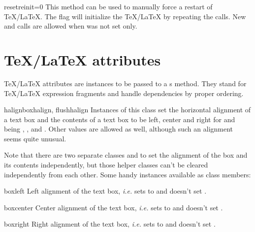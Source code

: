 \begin{methoddesc}{reset}{reinit=0}
  This method can be used to manually force a restart of
  \TeX/\LaTeX{}. The flag  will initialize the
  \TeX/\LaTeX{} by repeating the  calls. New
   and  calls are allowed when
   was not set only.
\end{methoddesc}


\section[TeX/LaTeX attributes]
{\TeX/\LaTeX{} attributes}

\TeX/\LaTeX{} attributes are instances to be passed to a
s  method. They stand for
\TeX/\LaTeX{} expression fragments and handle dependencies by proper
ordering.

\begin{classdesc}{halign}{boxhalign, flushhalign}
  Instances of this class set the horizontal alignment of a text box
  and the contents of a text box to be left, center and right for
   and  being , ,
  and . Other values are allowed as well, although such an
  alignment seems quite unusual.
\end{classdesc}

Note that there are two separate classes  and
 to set the alignment of the box and its contents
independently, but those helper classes can't be cleared independently
from each other. Some handy instances available as class members:

\begin{memberdesc}{boxleft}
  Left alignment of the text box, \emph{i.e.} sets  to
   and doesn't set .
\end{memberdesc}

\begin{memberdesc}{boxcenter}
  Center alignment of the text box, \emph{i.e.} sets  to
   and doesn't set .
\end{memberdesc}

\begin{memberdesc}{boxright}
  Right alignment of the text box, \emph{i.e.} sets  to
   and doesn't set .
\end{memberdesc}


